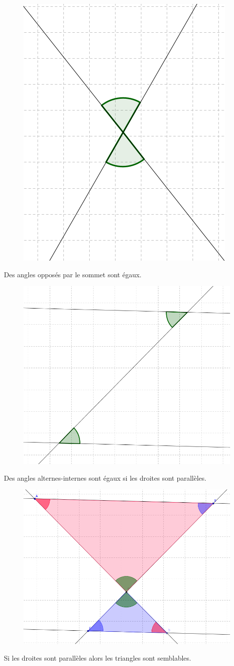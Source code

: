 \documentclass[11pt]{article}
\begin{document}
\begin{center}
\begin{multicols}{2}

  \begin{figure}[H]
    \centering
    \includegraphics[width=0.3\linewidth]{3x6-thales/sources/dr-3.png}
  \end{figure}

  Des angles opposés par le sommet sont égaux.\columnbreak

  \begin{figure}[H]
    \centering
    \includegraphics[width=0.5\linewidth]{3x6-thales/sources/dr-4.png}
  \end{figure}

Des angles alternes-internes sont égaux si les droites sont parallèles. 

\end{multicols}

\begin{figure}[H]
  \centering
  \includegraphics[width=0.3\linewidth]{3x6-thales/sources/dr-5.png}
\end{figure}

Si les droites sont parallèles alors les triangles sont semblables.
\end{center}
\end{document}
